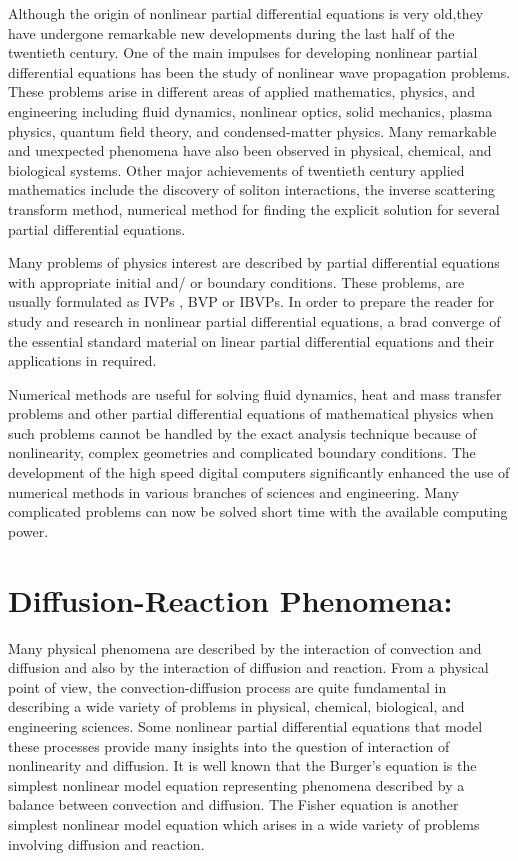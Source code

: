 Although the origin of nonlinear partial differential equations is very old,they have undergone
remarkable new developments during the last half of the twentieth century. One of the main impulses
for developing nonlinear partial differential equations has been the study of nonlinear wave propagation
problems. These problems arise in different areas of applied mathematics, physics, and engineering including
fluid dynamics, nonlinear optics, solid mechanics, plasma physics, quantum field theory, and condensed-matter physics.
Many remarkable and unexpected phenomena have also been observed in physical, chemical, and biological systems. Other
major achievements of twentieth  century applied mathematics include the discovery of soliton interactions, the inverse
scattering transform method, numerical method for finding the explicit solution for several partial differential equations.\

Many problems of physics interest are described by partial differential equations with appropriate initial and/ or boundary conditions.
These problems, are usually formulated as IVPs , BVP or IBVPs. In order to prepare the reader for study and research in nonlinear partial
differential equations, a brad converge of the essential standard material on linear partial differential equations and their applications
in required.\

Numerical methods are useful for solving fluid dynamics, heat and mass transfer problems and other partial differential equations of mathematical
physics when such problems cannot be handled by the exact analysis technique because of nonlinearity, complex geometries and complicated boundary
conditions. The development of the high speed digital computers significantly enhanced the use of numerical methods in various branches of sciences
and engineering. Many complicated problems can now be solved short time with the available computing power.

\section{Diffusion-Reaction Phenomena: }
Many physical phenomena are described by the interaction of convection and diffusion and also by the interaction of diffusion and reaction.
From a physical point of view, the convection-diffusion process are quite fundamental in describing a wide variety of problems in physical,
chemical, biological, and engineering sciences. Some nonlinear partial differential equations that model these processes provide many insights
into the question of interaction of nonlinearity and diffusion. It is well known that the Burger's equation is the simplest nonlinear model
equation representing phenomena described by a balance between convection and diffusion. The Fisher equation is another simplest nonlinear
model equation which arises in a wide variety of problems involving diffusion and reaction.

